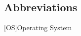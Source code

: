 \newcommand{\abbr}{Abbreviations}
\subsection*{Abbreviations}

\begin{acronym}[1234567890]		%
\setlength{\itemsep}{-\parsep}	%

[OS]{Operating System}


\end{acronym}